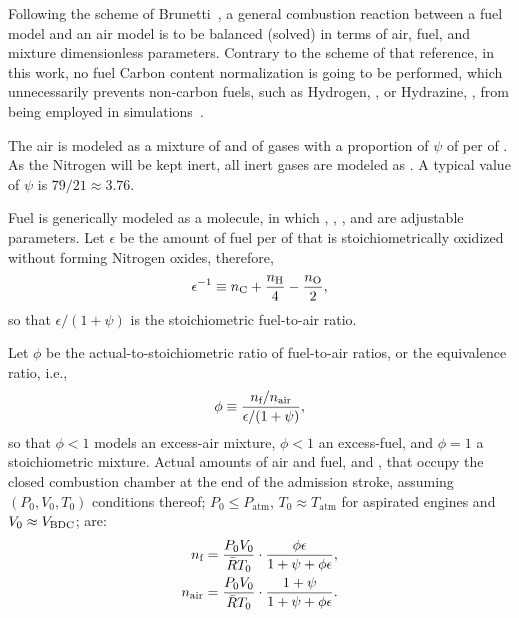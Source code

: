     Following the scheme of Brunetti~\cite{2012-BrunettiF-Blucher}, a general combustion reaction between a fuel model and an air model is to be balanced (solved) in terms of  air,  fuel,  and
    mixture dimensionless parameters. Contrary to the scheme of that reference, in this work, no fuel Carbon content normalization is  going  to  be  performed,  which  unnecessarily  prevents
    non-carbon fuels, such as Hydrogen, , or Hydrazine, , from being employed in simulations~\cite{2018-SilvaRKO-UTFPR}.

    The air is modeled as a mixture of  and of  gases with a proportion of $\psi$ {\kilo\mole} of  per {\kilo\mole} of . As the Nitrogen will  be  kept  inert,  all
    inert gases are modeled as . A typical value of $\psi$ is $79/21 \approx 3.76$.

    Fuel is generically modeled as a  mol\-e\-cule, in which \NC, \NH, \NO, and {\NN} are adjustable parameters. Let $\epsilon$ be the amount of fuel  per  {\kilo\mole}
    of  that is stoichiometrically oxidized without forming Nitrogen oxides, therefore,%
    \begin{equation}
        \epsilon^{-1} \equiv \NC + \frac{\NH}{4} - \frac{\NO}{2},
        \label{eq:epsilon}
    \end{equation}
    \noindent so that $\epsilon / (1 + \psi)$ is the stoichiometric fuel-to-air ratio.

    Let $\phi$ be the actual-to-stoichiometric ratio of fuel-to-air ratios, or the equivalence ratio, i.e.,%
    \begin{equation}
        \phi \equiv \frac{n_{\mbox{\scriptsize f}}/n_{\mbox{\scriptsize air}}}{\epsilon / (1 + \psi)},
        \label{eq:phi}
    \end{equation}
    \noindent so that $\phi < 1$ models an excess-air mixture, $\phi < 1$ an excess-fuel, and $\phi = 1$ a stoichiometric mixture. Actual amounts of air and fuel, {\NA} and  \NF,  that  occupy
    the closed combustion chamber at the end of the admission stroke, assuming $(P_0, V_0, T_0)$ conditions thereof;  $P_0  \leqslant  P_{\mathrm{atm}}$,  $T_0  \approx  T_{\mathrm{atm}}$  for
    aspirated engines and $V_0 \approx V_{\mbox{\scriptsize BDC}}$; are:%
    \begin{align}
        \label{eq:nf}
        n_{\mbox{\scriptsize f}}     &= \frac{P_0V_0}{\bar{R}T_0}\cdot\frac{\phi\epsilon}{1 + \psi + \phi\epsilon}, \\
        \label{eq:na}
        n_{\mbox{\scriptsize air}}     &= \frac{P_0V_0}{\bar{R}T_0}\cdot\frac{1 + \psi}{1 + \psi + \phi\epsilon}.
    \end{align}

